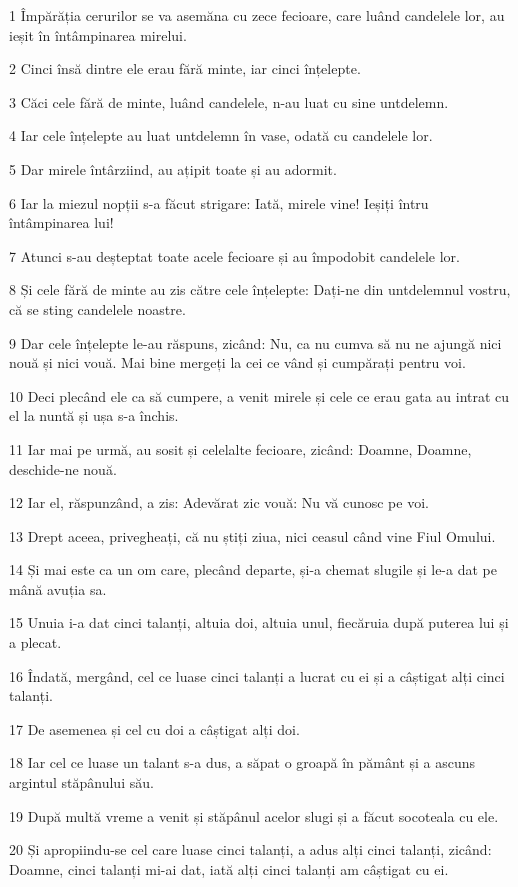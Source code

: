 \par 1 Împărăția cerurilor se va asemăna cu zece fecioare, care luând candelele lor, au ieșit în întâmpinarea mirelui.
\par 2 Cinci însă dintre ele erau fără minte, iar cinci înțelepte.
\par 3 Căci cele fără de minte, luând candelele, n-au luat cu sine untdelemn.
\par 4 Iar cele înțelepte au luat untdelemn în vase, odată cu candelele lor.
\par 5 Dar mirele întârziind, au ațipit toate și au adormit.
\par 6 Iar la miezul nopții s-a făcut strigare: Iată, mirele vine! Ieșiți întru întâmpinarea lui!
\par 7 Atunci s-au deșteptat toate acele fecioare și au împodobit candelele lor.
\par 8 Și cele fără de minte au zis către cele înțelepte: Dați-ne din untdelemnul vostru, că se sting candelele noastre.
\par 9 Dar cele înțelepte le-au răspuns, zicând: Nu, ca nu cumva să nu ne ajungă nici nouă și nici vouă. Mai bine mergeți la cei ce vând și cumpărați pentru voi.
\par 10 Deci plecând ele ca să cumpere, a venit mirele și cele ce erau gata au intrat cu el la nuntă și ușa s-a închis.
\par 11 Iar mai pe urmă, au sosit și celelalte fecioare, zicând: Doamne, Doamne, deschide-ne nouă.
\par 12 Iar el, răspunzând, a zis: Adevărat zic vouă: Nu vă cunosc pe voi.
\par 13 Drept aceea, privegheați, că nu știți ziua, nici ceasul când vine Fiul Omului.
\par 14 Și mai este ca un om care, plecând departe, și-a chemat slugile și le-a dat pe mână avuția sa.
\par 15 Unuia i-a dat cinci talanți, altuia doi, altuia unul, fiecăruia după puterea lui și a plecat.
\par 16 Îndată, mergând, cel ce luase cinci talanți a lucrat cu ei și a câștigat alți cinci talanți.
\par 17 De asemenea și cel cu doi a câștigat alți doi.
\par 18 Iar cel ce luase un talant s-a dus, a săpat o groapă în pământ și a ascuns argintul stăpânului său.
\par 19 După multă vreme a venit și stăpânul acelor slugi și a făcut socoteala cu ele.
\par 20 Și apropiindu-se cel care luase cinci talanți, a adus alți cinci talanți, zicând: Doamne, cinci talanți mi-ai dat, iată alți cinci talanți am câștigat cu ei.
